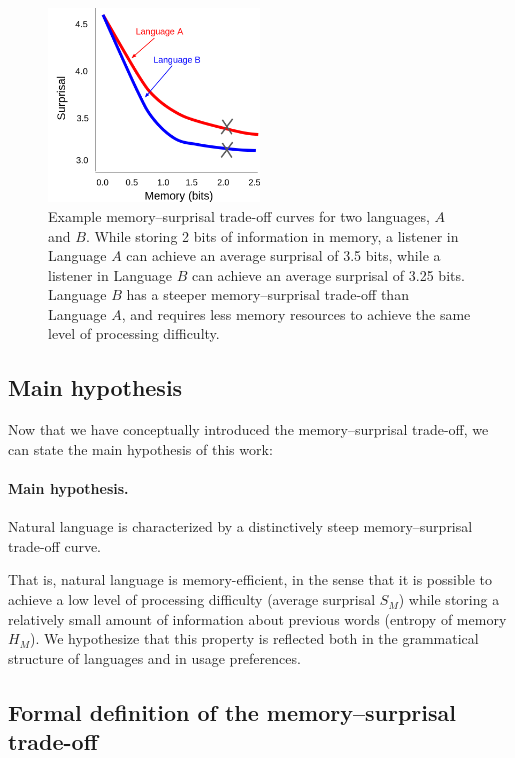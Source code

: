 \begin{figure}
\centering
\includegraphics[width=0.5\textwidth]{figures-gdrive/tradeoff.png}
\caption{Example memory--surprisal trade-off curves for two languages, $A$ and $B$. While storing 2 bits of information in memory, a listener in Language $A$ can achieve an average surprisal of 3.5 bits, while a listener in Language $B$ can achieve an average surprisal of 3.25 bits. Language $B$ has a steeper memory--surprisal trade-off than Language $A$, and requires less memory resources to achieve the same level of processing difficulty.}
\label{fig:examples}
\end{figure}

\subsection{Main hypothesis}

Now that we have conceptually introduced the memory--surprisal trade-off, we can state the main hypothesis of this work:

\paragraph{Main hypothesis.}  Natural language is characterized by a distinctively steep memory--surprisal trade-off curve.

That is, natural language is memory-efficient, in the sense that it is possible to achieve a low level of processing difficulty (average surprisal $S_M$) while storing a relatively small amount of information about previous words (entropy of memory $H_M$). We hypothesize that this property is reflected both in the grammatical structure of languages and in usage preferences.


\subsection{Formal definition of the memory--surprisal trade-off}
\label{sec:formal-tradeoff}

